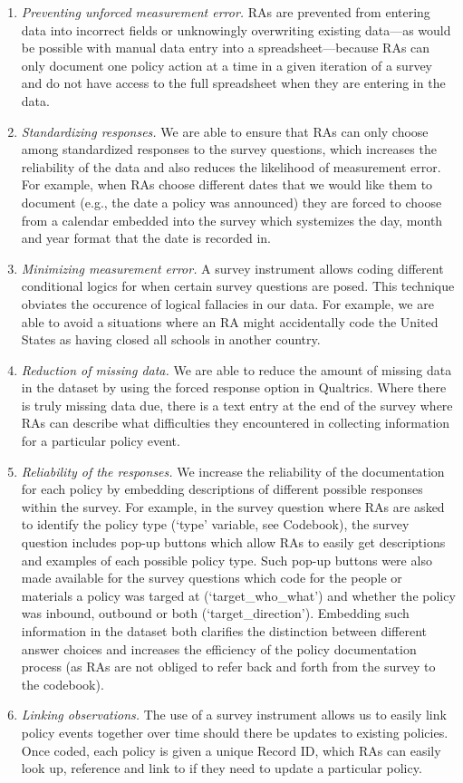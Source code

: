 \documentclass[]{article}
\begin{document}
\begin{enumerate}
\def\labelenumi{\arabic{enumi}.}
\item
  \emph{Preventing unforced measurement error.} RAs are prevented from entering data into incorrect fields or unknowingly overwriting existing data---as would be possible with manual data entry into a spreadsheet---because RAs can only document one policy action at a time in a given iteration of a survey and do not have access to the full spreadsheet when they are entering in the data.
\item
  \emph{Standardizing responses.} We are able to ensure that RAs can only choose among standardized responses to the survey questions, which increases the reliability of the data and also reduces the likelihood of measurement error. For example, when RAs choose different dates that we would like them to document (e.g., the date a policy was announced) they are forced to choose from a calendar embedded into the survey which systemizes the day, month and year format that the date is recorded in.
\item
  \emph{Minimizing measurement error.} A survey instrument allows coding different conditional logics for when certain survey questions are posed. This technique obviates the occurence of logical fallacies in our data. For example, we are able to avoid a situations where an RA might accidentally code the United States as having closed all schools in another country.
\item
  \emph{Reduction of missing data.} We are able to reduce the amount of missing data in the dataset by using the forced response option in Qualtrics. Where there is truly missing data due, there is a text entry at the end of the survey where RAs can describe what difficulties they encountered in collecting information for a particular policy event.
\item
  \emph{Reliability of the responses.} We increase the reliability of the documentation for each policy by embedding descriptions of different possible responses within the survey. For example, in the survey question where RAs are asked to identify the policy type (`type' variable, see Codebook), the survey question includes pop-up buttons which allow RAs to easily get descriptions and examples of each possible policy type. Such pop-up buttons were also made available for the survey questions which code for the people or materials a policy was targed at (`target\_who\_what') and whether the policy was inbound, outbound or both (`target\_direction'). Embedding such information in the dataset both clarifies the distinction between different answer choices and increases the efficiency of the policy documentation process (as RAs are not obliged to refer back and forth from the survey to the codebook).
\item
  \emph{Linking observations.} The use of a survey instrument allows us to easily link policy events together over time should there be updates to existing policies. Once coded, each policy is given a unique Record ID, which RAs can easily look up, reference and link to if they need to update a particular policy.
\end{enumerate}
\end{document}
